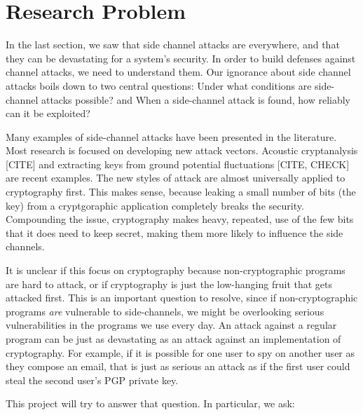 \documentclass{acm_proc_article-sp}
\begin{document}
\section{Research Problem}

In the last section, we saw that side channel attacks are everywhere, and that
they can be devastating for a system's security. In order to build defenses
against channel attacks, we need to understand them. Our ignorance about side
channel attacks boils down to two central questions: Under what conditions are
side-channel attacks possible? and When a side-channel attack is found, how
reliably can it be exploited?

Many examples of side-channel attacks have been presented in the literature.
Most research is focused on developing new attack vectors. Acoustic
cryptanalysis [CITE] and extracting keys from ground potential fluctuations
[CITE, CHECK] are recent examples. The new styles of attack are almost
universally applied to cryptography first. This makes sense, because leaking
a small number of bits (the key) from a cryptgoraphic application completely
breaks the security. Compounding the issue, cryptography makes heavy, repeated,
use of the few bits that it does need to keep secret, making them more likely to
influence the side channels.

It is unclear if this focus on cryptography because non-cryptographic programs
are hard to attack, or if cryptography is just the low-hanging fruit that gets
attacked first. This is an important question to resolve, since if
non-cryptographic programs \emph{are} vulnerable to side-channels, we might be
overlooking serious vulnerabilities in the programs we use every day. An attack
against a regular program can be just as devastating as an attack against an
implementation of cryptography. For example, if it is possible for one user to
spy on another user as they compose an email, that is just as serious an attack
as if the first user could steal the second user's PGP private key.

This project will try to answer that question. In particular, we ask:
\end{document}
